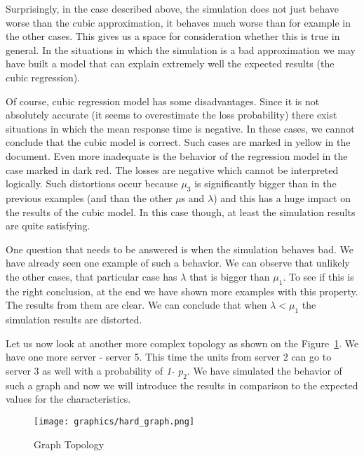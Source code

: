 \documentclass[12pt]{article}
\theoremstyle{plain}
\begin{document}
Surprisingly, in the case described above, the simulation does not just behave
worse than the cubic approximation, it behaves much worse than for example in
the other cases. This gives us a space for consideration whether this is true in
general. In the situations in which the simulation is a bad approximation we
may have built a model that can explain extremely well the expected results (the cubic regression).

Of course, cubic regression model has some disadvantages. Since it is not
absolutely accurate (it seems to overestimate the loss probability) there exist
situations in which the mean response time is negative. In these cases, we
cannot conclude that the cubic model is correct. Such cases are marked in
yellow in the document. Even more inadequate is the behavior of the regression
model in the case marked in dark red. The losses are negative which
cannot be interpreted logically.  Such distortions occur because $\mu_3$ is
significantly bigger than in the previous examples (and than the other $\mu$s
and $\lambda$) and this has a huge impact on the results of the cubic model. In
this case though, at least the simulation results are quite satisfying.

One question that needs to be answered is when the simulation behaves bad.
We have already seen one example of such a behavior. We can observe that
unlikely the other cases, that particular case has $\lambda$ that is bigger than
$\mu_1$. To see if this is the right conclusion, at the end we have shown more
examples with this property. The results from them are clear. We can conclude
that when $\lambda < \mu_1$ the simulation results are distorted.

Let us now look at another more complex topology as shown on the Figure~\ref{fig:hard_graph}.
We have one more server - server 5. This time the units from server 2 can go to
server 3 as well with a probability of \emph{1- $p_2$}. We have simulated the
behavior of such a graph and now we will introduce the results in comparison to
the expected values for the characteristics.

\begin{figure}
  \caption{Graph Topology}
  \texttt{[image: graphics/hard\_graph.png]}
  \label{fig:hard_graph}
\end{figure}
\end{document}
